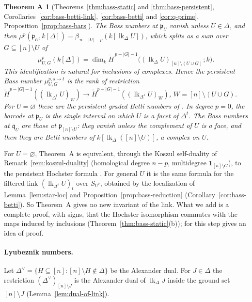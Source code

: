 \documentclass[11pt]{article}
\theoremstyle{plain}
\newtheorem*{theoremA}{Theorem A}
\theoremstyle{definition}
\newcommand{\kk}{k}
\newcommand{\pp}{\mathfrak{p}}
\newcommand{\link}{\operatorname{lk}}
\newcommand{\rH}{\widetilde{H}}
\newcommand{\one}{\mathbf 1}
\begin{document}
\begin{theoremA}[Theorems~\ref{thm:bass-static} and \ref{thm:bass-persistent}, Corollaries~\ref{cor:bass-betti-link}, \ref{cor:bass-betti} and \ref{cor:q-prime}, Proposition~\ref{prop:bass-bars}]
The Bass numbers at $\pp_U$ vanish unless $U\in\Delta$, and then
$\mu^p(\pp_U,\kk[\Delta])=\beta_{\,n-|U|-p}(\kk[\link_\Delta U])$, which splits as a sum over $G\subseteq[n]\setminus U$
of
\[
\mu^p_{U,G}(\kk[\Delta])=\dim_\kk\rH^{\,p-|G|-1}\bigl((\link_\Delta U)_{[n]\setminus(U\cup G)};\kk\bigr).
\]
This identification is natural for inclusions of complexes. Hence the persistent Bass number
$\mu^{p,s\to t}_{U,G}$ is the rank of restriction
$\rH^{p-|G|-1}((\link_{\Delta^t}U)_W)\to\rH^{p-|G|-1}((\link_{\Delta^s}U)_W)$, $W=[n]\setminus(U\cup G)$.
For $U=\varnothing$ these are the persistent graded Betti numbers of \cite{SuwayyidWeiGraphs}. In degree
$p=0$, the barcode at $\pp_U$ is the single interval on which $U$ is a facet of $\Delta^t$. The Bass numbers
at $\mathfrak q_U$ are those at $\pp_{[n]\setminus U}$: they vanish unless the complement of $U$ is a face, and
then they are Betti numbers of $\kk[\link_\Delta([n]\setminus U)]$, a complex on $U$.
\end{theoremA}

For $U=\varnothing$, Theorem~A is equivalent, through the Koszul self-duality of
Remark~\ref{rem:koszul-duality} (homological degree $n-p$, multidegree
$\one_{[n]\setminus G}$), to the persistent Hochster formula
\cite[Thm~3.2]{SuwayyidWeiGraphs}. For general $U$ it is the same formula for the
filtered link $(\link_{\Delta^t}U)_t$ over $S_{U^c}$, obtained by the localization of
Lemma~\ref{lem:star-loc} and Proposition~\ref{prop:bass-reduction}
(Corollary~\ref{cor:bass-betti}). So Theorem~A gives no new invariant of the link. What
we add is a complete proof, with signs, that the Hochster isomorphism commutes with the
maps induced by inclusions (Theorem~\ref{thm:bass-static}(b)); for this step
\cite{SuwayyidWeiGraphs} gives an idea of proof.

\paragraph{Lyubeznik numbers.} Let $\Delta^\vee=\{H\subseteq[n]:[n]\setminus H\notin\Delta\}$ be the Alexander
dual. For $J\in\Delta$ the restriction $(\Delta^\vee)_{[n]\setminus J}$ is the Alexander dual of $\link_\Delta J$
inside the ground set $[n]\setminus J$ (Lemma~\ref{lem:dual-of-link}).
\end{document}
